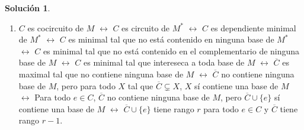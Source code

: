 \documentclass[10pt]{article}
\theoremstyle{definition}
\newtheorem*{sol}{Solución}
\begin{document}
\begin{sol}\phantom{}
\begin{enumerate}
\item 

$C$ es cocircuito de $M$ $\longleftrightarrow$ $C$ es circuito de $M^*$ $\longleftrightarrow$ $C$ es dependiente minimal de $M^*$ $\longleftrightarrow$ $C$ es minimal tal que no está contenido en ninguna base de $M^*$ $\longleftrightarrow$ $C$ es minimal tal que no está contenido en el complementario de ninguna base de $M$ $\longleftrightarrow$ $C$ es minimal tal que intereseca a toda base de $M$ $\longleftrightarrow$ $\overline{C}$ es maximal tal que no contiene ninguna base de $M$ $\longleftrightarrow$ $\overline{C}$ no contiene ninguna base de $M$, pero para todo $X$ tal que $\overline{C}\subsetneq X$, $X$ sí contiene una base de $M$ $\longleftrightarrow$ Para todo $e\in C$, $\overline{C}$ no contiene ninguna base de $M$, pero $\overline{C}\cup\{e\}$ sí contiene una base de $M$ $\longleftrightarrow$ $\overline{C}\cup\{e\}$ tiene rango $r$ para todo $e\in C$ y $\overline{C}$ tiene rango $r-1$.


\end{enumerate}
\end{sol}
\end{document}
